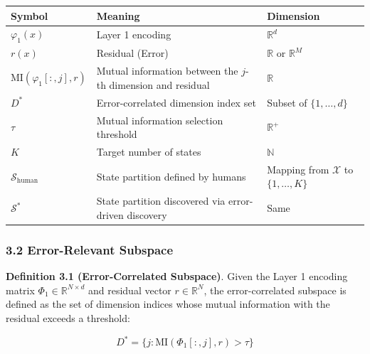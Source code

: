 \documentclass[
  12pt,
]{article}
\begin{document}
\begin{longtable}[]{@{}
  >{\raggedright\arraybackslash}p{}
  >{\raggedright\arraybackslash}p{}
  >{\raggedright\arraybackslash}p{}@{}}
\toprule\noalign{}
\begin{minipage}[b]{\linewidth}\raggedright
Symbol
\end{minipage} & \begin{minipage}[b]{\linewidth}\raggedright
Meaning
\end{minipage} & \begin{minipage}[b]{\linewidth}\raggedright
Dimension
\end{minipage} \\
\midrule\noalign{}
\endhead
\bottomrule\noalign{}
\endlastfoot
$\varphi_1(x)$ & Layer 1 encoding & $\mathbb{R}^d$ \\
$r(x)$ & Residual (Error) & $\mathbb{R}$ or $\mathbb{R}^M$ \\
$\text{MI}(\varphi_1[:, j], r)$ & Mutual information between the $j$-th dimension and residual & $\mathbb{R}$ \\
$D^*$ & Error-correlated dimension index set & Subset of $\{1,\dots,d\}$ \\
$\tau$ & Mutual information selection threshold & $\mathbb{R}^+$ \\
$K$ & Target number of states & $\mathbb{N}$ \\
$\mathcal{S}_{\text{human}}$ & State partition defined by humans & Mapping from $\mathcal{X}$ to $\{1,\dots,K\}$ \\
$\mathcal{S}^*$ & State partition discovered via error-driven discovery & Same \\
\end{longtable}

\subsubsection{3.2 Error-Relevant Subspace}\label{error-relevant-subspace}

\textbf{Definition 3.1 (Error-Correlated Subspace)}. Given the Layer 1 encoding matrix $\Phi_1 \in \mathbb{R}^{N \times d}$ and residual vector $r \in \mathbb{R}^N$, the error-correlated subspace is defined as the set of dimension indices whose mutual information with the residual exceeds a threshold:

\[D^* = \{j: \text{MI}(\Phi_1[:, j], r) > \tau\}\]
\end{document}
